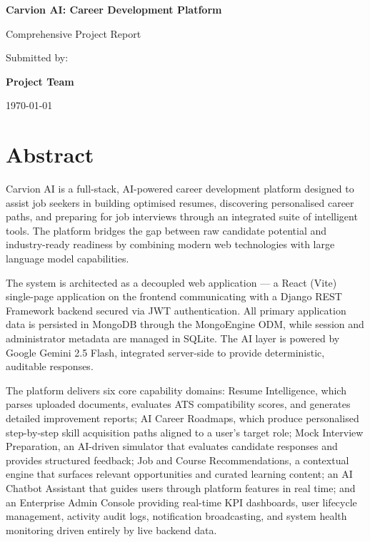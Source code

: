 \documentclass[12pt]{article}
\begin{document}
\begin{titlepage}
\centering
\vspace*{3cm}
{\Huge \textbf{Carvion AI: Career Development Platform} \par}
\vspace{1.5cm}
{\Large Comprehensive Project Report \par}
\vspace{4cm}
{\large Submitted by: \par}
{\large \textbf{Project Team} \par}
\vfill
{\large \today \par}
\end{titlepage}

\clearpage
\tableofcontents
\clearpage
\clearpage
\section{Abstract}

Carvion AI is a full-stack, AI-powered career development platform designed to assist job seekers in building optimised resumes, discovering personalised career paths, and preparing for job interviews through an integrated suite of intelligent tools. The platform bridges the gap between raw candidate potential and industry-ready readiness by combining modern web technologies with large language model capabilities.

The system is architected as a decoupled web application --- a React (Vite) single-page application on the frontend communicating with a Django REST Framework backend secured via JWT authentication. All primary application data is persisted in MongoDB through the MongoEngine ODM, while session and administrator metadata are managed in SQLite. The AI layer is powered by Google Gemini 2.5 Flash, integrated server-side to provide deterministic, auditable responses.

The platform delivers six core capability domains: Resume Intelligence, which parses uploaded documents, evaluates ATS compatibility scores, and generates detailed improvement reports; AI Career Roadmaps, which produce personalised step-by-step skill acquisition paths aligned to a user's target role; Mock Interview Preparation, an AI-driven simulator that evaluates candidate responses and provides structured feedback; Job and Course Recommendations, a contextual engine that surfaces relevant opportunities and curated learning content; an AI Chatbot Assistant that guides users through platform features in real time; and an Enterprise Admin Console providing real-time KPI dashboards, user lifecycle management, activity audit logs, notification broadcasting, and system health monitoring driven entirely by live backend data.
\end{document}

